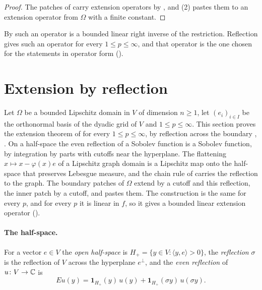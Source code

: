 \begin{proof}
\leanok
The patches of  carry extension operators by
, and  (2) pastes
them to an extension operator from $\Omega$ with a finite constant.
\end{proof}

By  such an operator is a bounded linear right inverse of
the restriction. Reflection gives such an operator for every $1 \leq p \leq \infty$, and that
operator is the one chosen for the statements in operator form
().

\section{Extension by reflection}
\label{sec:reflection-extension}

Let $\Omega$ be a bounded Lipschitz domain in $V$ of dimension $n \geq 1$, let
$(e_i)_{i \in I}$ be the orthonormal basis of the dyadic grid of $V$ and $1 \leq p \leq \infty$.
This section proves the extension theorem of  for every
$1 \leq p \leq \infty$, by reflection across the boundary \cite[Section~4.4]{EvansGariepy},
\cite[Chapter~9]{Brezis2011}. On a half-space the even reflection of a Sobolev function is a
Sobolev function, by integration by parts with cutoffs near the hyperplane. The flattening
$x \mapsto x - \varphi(x) e$ of a Lipschitz graph domain is a Lipschitz map onto the half-space
that preserves Lebesgue measure, and the chain rule of 
carries the reflection to the graph. The boundary patches of $\Omega$ extend by a cutoff and this
reflection, the inner patch by a cutoff, and  pastes them. The
construction is the same for every $p$, and for every $p$ it is linear in $f$, so it gives a
bounded linear extension operator ().

\paragraph{The half-space.}

\begin{definition}
\label{def:half-space-reflection}
\leanok
For a vector $e \in V$ the \emph{open half-space} is $H_+ = \{y \in V : \langle y, e \rangle > 0\}$,
the \emph{reflection} $\sigma$ is the reflection of $V$ across the hyperplane $e^\perp$, and the
\emph{even reflection} of $u \colon V \to \mathbb{C}$ is
\[
  E u(y) = \mathbf 1_{H_+}(y) \, u(y) + \mathbf 1_{H_+}(\sigma y) \, u(\sigma y) .
\]
\end{definition}

